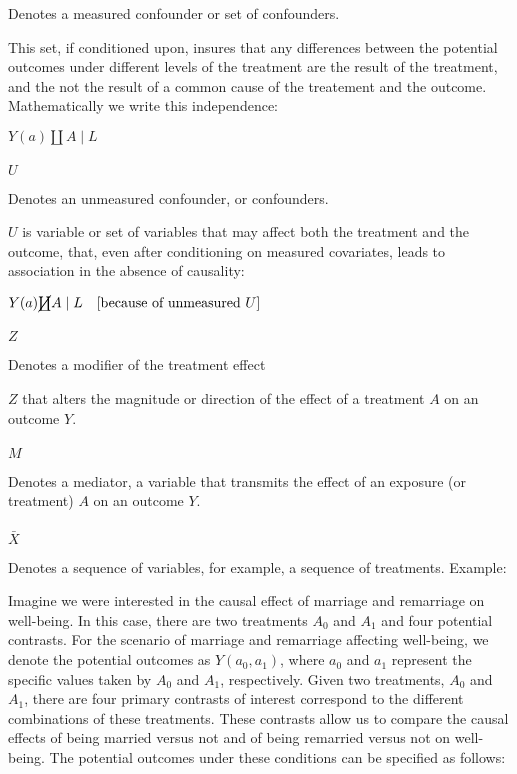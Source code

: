 \documentclass[
  single column]{article}
\makeatletter
\let\oldparagraph\paragraph
\renewcommand{\paragraph}{
    \@ifstar
      \xxxParagraphStar
      \xxxParagraphNoStar
  }
\newcommand{\xxxParagraphStar}[1]{\oldparagraph*{#1}\mbox{}}
\newcommand{\xxxParagraphNoStar}[1]{\oldparagraph{#1}\mbox{}}
\makeatother
\begin{document}
Denotes a measured confounder or set of confounders.

This set, if conditioned upon, insures that any differences between the
potential outcomes under different levels of the treatment are the
result of the treatment, and the not the result of a common cause of the
treatement and the outcome. Mathematically we write this independence:

\(Y(a)\coprod A \mid L\)

\paragraph{\texorpdfstring{\(U\)}{U}}\label{u}

Denotes an unmeasured confounder, or confounders.

\(U\) is variable or set of variables that may affect both the treatment
and the outcome, that, even after conditioning on measured covariates,
leads to association in the absence of causality:

\(Y(a) \cancel\coprod A \mid L \quad \text{[because of unmeasured } U]\)

\paragraph{\texorpdfstring{\(Z\)}{Z}}\label{z}

Denotes a modifier of the treatment effect

\(Z\) that alters the magnitude or direction of the effect of a
treatment \(A\) on an outcome \(Y\).

\paragraph{\texorpdfstring{\(M\)}{M}}\label{m}

Denotes a mediator, a variable that transmits the effect of an exposure
(or treatment) \(A\) on an outcome \(Y\).

\paragraph{\texorpdfstring{\(\bar{X}\)}{\textbackslash bar\{X\}}}\label{barx}

Denotes a sequence of variables, for example, a sequence of treatments.
Example:

Imagine we were interested in the causal effect of marriage and
remarriage on well-being. In this case, there are two treatments \(A_0\)
and \(A_1\) and four potential contrasts. For the scenario of marriage
and remarriage affecting well-being, we denote the potential outcomes as
\(Y(a_0, a_1)\), where \(a_0\) and \(a_1\) represent the specific values
taken by \(A_0\) and \(A_1\), respectively. Given two treatments,
\(A_0\) and \(A_1\), there are four primary contrasts of interest
correspond to the different combinations of these treatments. These
contrasts allow us to compare the causal effects of being married versus
not and of being remarried versus not on well-being. The potential
outcomes under these conditions can be specified as follows:
\end{document}
